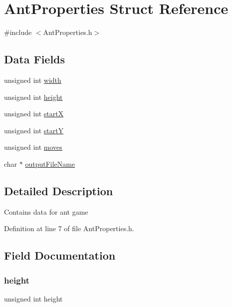 \hypertarget{struct_ant_properties}{}\section{Ant\+Properties Struct Reference}
\label{struct_ant_properties}


{\ttfamily \#include $<$Ant\+Properties.\+h$>$}

\subsection*{Data Fields}
\begin{DoxyCompactItemize}
\item 
unsigned int \mbox{\hyperlink{struct_ant_properties_aca34d28e3d8bcbcadb8edb4e3af24f8c}{width}}
\item 
unsigned int \mbox{\hyperlink{struct_ant_properties_ab2e78c61905b4419fcc7b4cfc500fe85}{height}}
\item 
unsigned int \mbox{\hyperlink{struct_ant_properties_af68dab6eb68aac629f3da017fd042789}{startX}}
\item 
unsigned int \mbox{\hyperlink{struct_ant_properties_a2cee0f2d55baab0e7dd2f97c9679bee8}{startY}}
\item 
unsigned int \mbox{\hyperlink{struct_ant_properties_ab6123efda71afe840f2cb5f45a56aae9}{moves}}
\item 
char $\ast$ \mbox{\hyperlink{struct_ant_properties_ac224b2769f256d5f706fde4c2fc17a11}{output\+File\+Name}}
\end{DoxyCompactItemize}


\subsection{Detailed Description}
Contains data for ant game 

Definition at line 7 of file Ant\+Properties.\+h.



\subsection{Field Documentation}
\mbox{\label{struct_ant_properties_ab2e78c61905b4419fcc7b4cfc500fe85}} 
\subsubsection{\texorpdfstring{height}{height}}
{\footnotesize\ttfamily unsigned int height}

